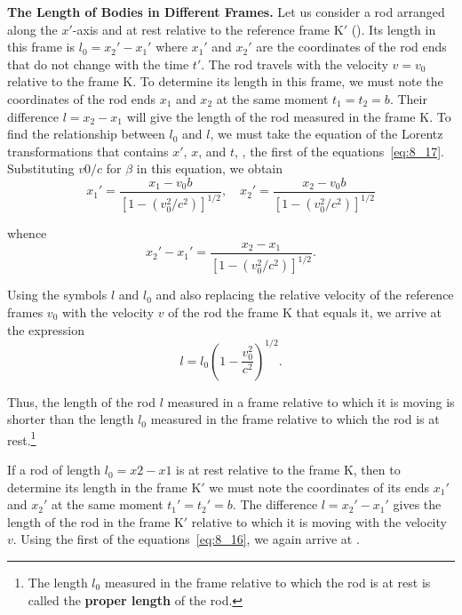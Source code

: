 \textbf{The Length of Bodies in Different Frames.} Let us consider a rod arranged along the $x'$-axis and at rest relative to the reference frame K$'$ (). Its length in this frame is $l_0=x_2'-x_1'$ where $x_1'$ and $x_2'$ are the coordinates of the rod ends that do not change with the time $t'$. The rod travels with the velocity $v=v_0$ relative to the frame K. To determine its length in this frame, we must note the coordinates of the rod ends $x_1$ and $x_2$ at the same moment $t_1=t_2=b$. Their difference $l=x_2-x_1$ will give the length of the rod measured in the frame K. To find the relationship between $l_0$ and $l$, we must take the equation of the Lorentz transformations that contains $x'$, $x$, and $t$, \ie, the first of the equations~\eqref{eq:8_17}. Substituting $v0/c$ for $\beta$ in this equation, we obtain
\begin{equation*}
	x_1' = \frac{x_1 - v_0 b}{\left[1 - \left(v_0^2/c^2\right)\right]^{1/2}},\quad x_2' = \frac{x_2 - v_0 b}{\left[1 - \left(v_0^2/c^2\right)\right]^{1/2}}
\end{equation*}

\noindent
whence
\begin{equation*}
	x_2' - x_1' = \frac{x_2 - x_1}{\left[1 - \left(v_0^2/c^2\right)\right]^{1/2}}.
\end{equation*}

\noindent
Using the symbols $l$ and $l_0$ and also replacing the relative velocity of the reference frames $v_0$ with the velocity $v$ of the rod the frame K that equals it, we arrive at the expression
\begin{equation}\label{eq:8_19}
	l = l_0 \left(1 - \frac{v_0^2}{c^2}\right)^{1/2}.
\end{equation}

\noindent
Thus, the length of the rod $l$ measured in a frame relative to which it is moving is shorter than the length $l_0$ measured in the frame relative to which the rod is at rest.\footnote{The length $l_0$ measured in the frame relative to which the rod is at rest is called the \textbf{proper length} of the rod.}

If a rod of length $l_0=x2-x1$ is at rest relative to the frame K, then to determine its length in the frame K$'$ we must note the coordinates of its ends $x_1'$ and $x_2'$ at the same moment $t_1'=t_2'=b$. The difference $l=x_2'-x_1'$ gives the length of the rod in the frame K$'$ relative to which it is moving with the velocity $v$. Using the first of the equations~\eqref{eq:8_16}, we again arrive at .

